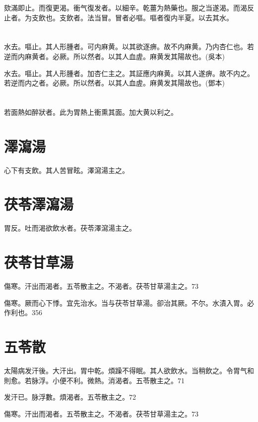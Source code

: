 \documentclass[b5paper,twoside,zihao=-4,UTF8]{ctexbook}
\begin{document}
欬滿即止。而復更渴。衝气復发者。以細辛。乾薑为熱藥也。服之当遂渴。而渴反止者。为支飲也。支飲者。法当冒。冒者必嘔。嘔者復内半夏。以去其水。

\section{}

水去。嘔止。其人形腫者。可内麻黄。以其欲逐痹。故不内麻黄。乃内杏仁也。若逆而内麻黄者。必厥。所以然者。以其人血虗。麻黄发其陽故也。(吳本)

水去。嘔止。其人形腫者。加杏仁主之。其証應内麻黄。以其人遂痹。故不内之。若逆而内之者。必厥。所以然者。以其人血虗。麻黄发其陽故也。(鄧本)

\section{}

若面熱如醉{狀者}。此为胃熱上衝熏其面。加大黄以利之。

\section{澤瀉湯}

心下有支飲。其人苦冒眩。澤瀉湯主之。

\section{茯苓澤瀉湯}

胃反。吐而渴欲飲水者。茯苓澤瀉湯主之。

\section{茯苓甘草湯}

傷寒。汗出而渴者。五苓散主之。不渴者。茯苓甘草湯主之。73

傷寒。厥而心下悸。宜先治水。当与茯苓甘草湯。卻治其厥。不尔。水漬入胃。必作利也。356

\section{五苓散}

太陽病发汗後。大汗出。胃中乾。煩躁不得眠。其人欲飲水。当稍飲之。令胃气和則愈。若脉浮。小便不利。微熱。消渴者。五苓散主之。71

发汗已。脉浮數。煩渴者。五苓散主之。72

傷寒。汗出而渴者。五苓散主之。不渴者。茯苓甘草湯主之。73
\end{document}
